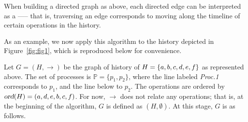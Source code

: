 \documentclass[12pt]{article}
\begin{document}
\begin{remark}
When building a directed graph as above, each directed edge can be interpreted as a  —-- that is, traversing an edge corresponds to moving along the timeline of certain operations in the history.
\end{remark}

\begin{example}

As an example, we now apply this algorithm to the history depicted in Figure~\ref{fig:fig1}, which is reproduced below for convenience.

\begin{figure}[H]
\begin{center}
\end{center}
\end{figure}

Let $G=(H,\rightarrow)$ be the graph of history of \mbox{$H=\{a,b,c,d,e,f\}$} as represented above. The set of processes is $\mathbb{P}=\{p_1,p_2\}$, where the line labeled \emph{Proc.1} corresponds to $p_1$, and the line below to $p_2$. The operations are ordered by $\textsl{ord}(H)=(a,d,e,b,c,f)$. For now, $\rightarrow$ does not relate any operations; that is, at the beginning of the algorithm, $G$ is defined as $(H,\emptyset)$. At this stage, $G$ is as follows.


\end{example}
\end{document}
